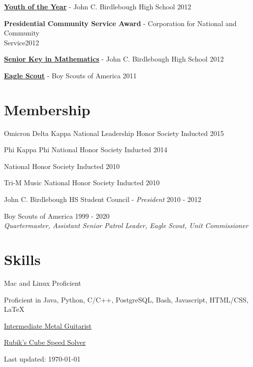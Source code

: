 \documentclass[8pt]{article}
\def\footerlink{}
\renewenvironment{itemize}{
  \begin{list}{}{
    \setlength{\leftmargin}{1.5em}
  }
}{
  \end{list}
}
\begin{document}
\begin{itemize}
\item \textbf{\href{http://www.oswegocountyweeklies.com/phoenix_register.php?details&story_id=5101&story_year=2012&story_month=5}{Youth of the Year}} - John C. Birdlebough High School \hfill 2012

\item \textbf{Presidential Community Service Award} - Corporation for National and Community \\Service\hfill 2012

\item \textbf{\href{http://www.oswegocountyweeklies.com/phoenix_register.php?details&story_id=5503&story_year=2012&story_month=6}{Senior Key in Mathematics}} - John C. Birdlebough High School \hfill 2012

\item \textbf{\href{http://www.oswegocountyweeklies.com/phoenix_register.php?details&story_id=6083&story_year=2012&story_month=8}{Eagle Scout}} - Boy Scouts of America \hfill 2011
\end{itemize}

\section*{Membership}
\begin{itemize}
\item Omicron Delta Kappa National Leadership Honor Society \hfill Inducted 2015
\item Phi Kappa Phi National Honor Society \hfill Inducted 2014
\item National Honor Society \hfill Inducted 2010
\item Tri-M Music National Honor Society \hfill Inducted 2010
\item John C. Birdlebough HS Student Council - \emph{President} \hfill 2010 - 2012
\item Boy Scouts of America \hfill 1999 - 2020\\
\emph{Quartermaster, Assistant Senior Patrol Leader, Eagle Scout, Unit Commissioner}
\end{itemize}

\section*{Skills}
\begin{itemize}
\item Mac and Linux Proficient
\item Proficient in Java, Python, C/C++, PostgreSQL, Bash, Javascript, HTML/CSS, {\LaTeX}
\item \href{https://youtube.com/shorts/oZ0A9FKN5i8?feature=share}{Intermediate Metal Guitarist}
\item \href{https://youtu.be/qPBg2xok04s}{Rubik's Cube Speed Solver}
\end{itemize}

\bigskip

\begin{center}
  \begin{footnotesize}
    Last updated: \today \\
    \href{\footerlink}{\texttt{\footerlink}}
  \end{footnotesize}
\end{center}
\end{document}
